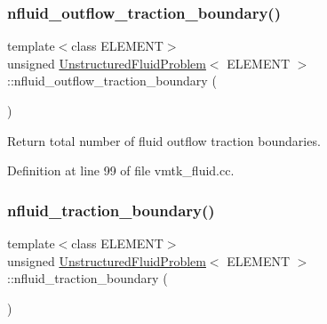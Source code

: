\mbox{\label{classUnstructuredFluidProblem_abcaa700f2e0e1b2097e7dc25fe087862}} 
\subsubsection{\texorpdfstring{nfluid\+\_\+outflow\+\_\+traction\+\_\+boundary()}{nfluid\_outflow\_traction\_boundary()}}
{\footnotesize\ttfamily template$<$class E\+L\+E\+M\+E\+NT$>$ \\
unsigned \hyperlink{classUnstructuredFluidProblem}{Unstructured\+Fluid\+Problem}$<$ E\+L\+E\+M\+E\+NT $>$\+::nfluid\+\_\+outflow\+\_\+traction\+\_\+boundary (\begin{DoxyParamCaption}{ }\end{DoxyParamCaption})\hspace{0.3cm}{\ttfamily [inline]}}



Return total number of fluid outflow traction boundaries. 



Definition at line 99 of file vmtk\+\_\+fluid.\+cc.

\mbox{\label{classUnstructuredFluidProblem_ae04e768e915a5e097527cea22558203d}} 
\subsubsection{\texorpdfstring{nfluid\+\_\+traction\+\_\+boundary()}{nfluid\_traction\_boundary()}}
{\footnotesize\ttfamily template$<$class E\+L\+E\+M\+E\+NT$>$ \\
unsigned \hyperlink{classUnstructuredFluidProblem}{Unstructured\+Fluid\+Problem}$<$ E\+L\+E\+M\+E\+NT $>$\+::nfluid\+\_\+traction\+\_\+boundary (\begin{DoxyParamCaption}{ }\end{DoxyParamCaption})\hspace{0.3cm}{\ttfamily [inline]}}




